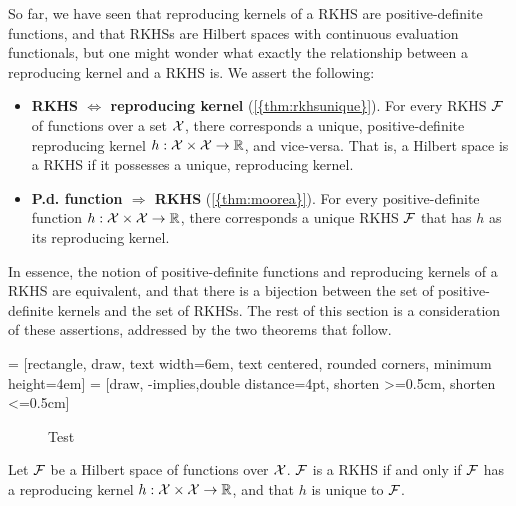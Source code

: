 So far, we have seen that reproducing kernels of a RKHS are positive-definite functions, and that RKHSs are Hilbert spaces with continuous evaluation functionals, but one might wonder what exactly the relationship between a reproducing kernel and a RKHS is.
We assert the following:
\begin{itemize}
  \item \textbf{RKHS $\Leftrightarrow$ reproducing kernel} (\cref{{thm:rkhsunique}}). For every RKHS ${\mathcal F}$ of functions over a set ${\mathcal X}$, there corresponds a unique, positive-definite reproducing kernel $h:{\mathcal X}\times{\mathcal X}\to\mathbb{R}$, and vice-versa. That is, a Hilbert space is a RKHS if it possesses a unique, reproducing kernel.
  \item \textbf{P.d. function $\Rightarrow$ RKHS} (\cref{{thm:moorea}}). For every positive-definite function $h:{\mathcal X}\times{\mathcal X}\to\mathbb{R}$, there corresponds a unique RKHS ${\mathcal F}$ that has $h$ as its reproducing kernel.
\end{itemize}
In essence, the notion of positive-definite functions and reproducing kernels of a RKHS are equivalent, and that there is a bijection between the set of positive-definite kernels and the set of RKHSs.
The rest of this section is a consideration of these assertions, addressed by the two theorems that follow.

 = [rectangle, draw, text width=6em, text centered, rounded corners, minimum height=4em]
 = [draw, -implies,double distance=4pt, shorten >=0.5cm, shorten <=0.5cm]

\begin{figure}
  \centering
  \caption{Test}
\end{figure}


\begin{theorem}\label{thm:rkhsunique}
  Let ${\mathcal F}$ be a Hilbert space of functions over ${\mathcal X}$.
  ${\mathcal F}$ is a RKHS if and only if ${\mathcal F}$ has a reproducing kernel $h:{\mathcal X}\times{\mathcal X}\to\mathbb{R}$, and that $h$ is unique to ${\mathcal F}$.
\end{theorem}

